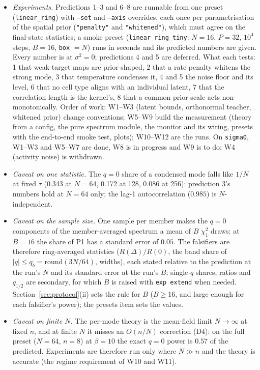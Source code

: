 \documentclass[11pt,a4paper]{article}
\newcommand{\code}[1]{\texttt{#1}}
\begin{document}
\begin{itemize}[nosep]
  \item \emph{Experiments.} Predictions 1--3 and 6--8 are runnable from one preset (\code{linear\_ring}) with \code{--set} and \code{--axis} overrides, each once per parametrisation of the spatial prior (\code{"penalty"} and \code{"whitened"}), which must agree on the final-state statistics; a smoke preset (\code{linear\_ring\_tiny}: $N = 16$, $P = 32$, $10^4$ steps, $B = 16$, \code{box} $= N$) runs in seconds and its predicted numbers are given. Every number is at $\sigma^2 = 0$; predictions 4 and 5 are deferred. What each tests: 1 that weak-target maps are prior-shaped, 2 that a rate penalty whitens the strong mode, 3 that temperature condenses it, 4 and 5 the noise floor and its level, 6 that no cell type aligns with an individual latent, 7 that the correlation length is the kernel's, 8 that a common prior scale acts non-monotonically. Order of work: W1--W3 (latent bounds, orthonormal teacher, whitened prior) change conventions; W5--W9 build the measurement (theory from a config, the pure spectrum module, the monitor and its wiring, presets with the end-to-end smoke test, plots); W10--W12 are the runs. On \code{sigma0}, W1--W3 and W5--W7 are done, W8 is in progress and W9 is to do; W4 (activity noise) is withdrawn.
  \item \emph{Caveat on one statistic.} The $q = 0$ share of a condensed mode falls like $1/N$ at fixed $\tau$ (0.343 at $N = 64$, 0.172 at 128, 0.086 at 256): prediction 3's numbers hold at $N = 64$ only; the lag-1 autocorrelation ($0.985$) is $N$-independent.
  \item \emph{Caveat on the sample size.} One sample per member makes the $q = 0$ components of the member-averaged spectrum a mean of $B$ $\chi^2_1$ draws: at $B = 16$ the share of P1 has a standard error of $0.05$. The falsifiers are therefore ring-averaged statistics ($R(\Delta)/R(0)$, the band share of $|q|\le q_b = \mathrm{round}(3N/64)$, widths), each stated relative to the prediction at the run's $N$ and its standard error at the run's $B$; single-$q$ shares, ratios and $q_{1/2}$ are secondary, for which $B$ is raised with \code{exp extend} when needed. Section~\ref{sec:protocol}(ii) sets the rule for $B$ ($B\ge16$, and large enough for each falsifier's power); the presets item sets the values.
  \item \emph{Caveat on finite $N$.} The per-mode theory is the mean-field limit $N\to\infty$ at fixed $n$, and at finite $N$ it misses an $O(n/N)$ correction (D4): on the full preset ($N = 64$, $n = 8$) at $\beta = 10$ the exact $q = 0$ power is $0.57$ of the predicted. Experiments are therefore run only where $N\gg n$ and the theory is accurate (the regime requirement of W10 and W11).
\end{itemize}
\end{document}
